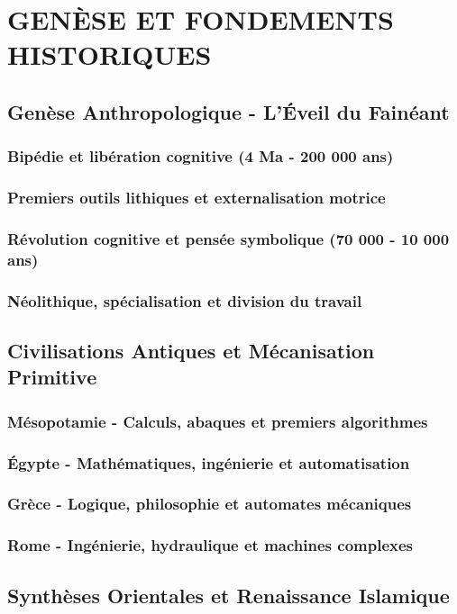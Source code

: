 \documentclass[12pt,a4paper]{book}
\begin{document}
\newpage
\part{GENÈSE ET FONDEMENTS HISTORIQUES}

\chapter{Genèse Anthropologique - L'Éveil du Fainéant}
\section{Bipédie et libération cognitive (4 Ma - 200 000 ans)}
\section{Premiers outils lithiques et externalisation motrice}
\section{Révolution cognitive et pensée symbolique (70 000 - 10 000 ans)}
\section{Néolithique, spécialisation et division du travail}

\chapter{Civilisations Antiques et Mécanisation Primitive}
\section{Mésopotamie - Calculs, abaques et premiers algorithmes}
\section{Égypte - Mathématiques, ingénierie et automatisation}
\section{Grèce - Logique, philosophie et automates mécaniques}
\section{Rome - Ingénierie, hydraulique et machines complexes}

\chapter{Synthèses Orientales et Renaissance Islamique}
\end{document}
